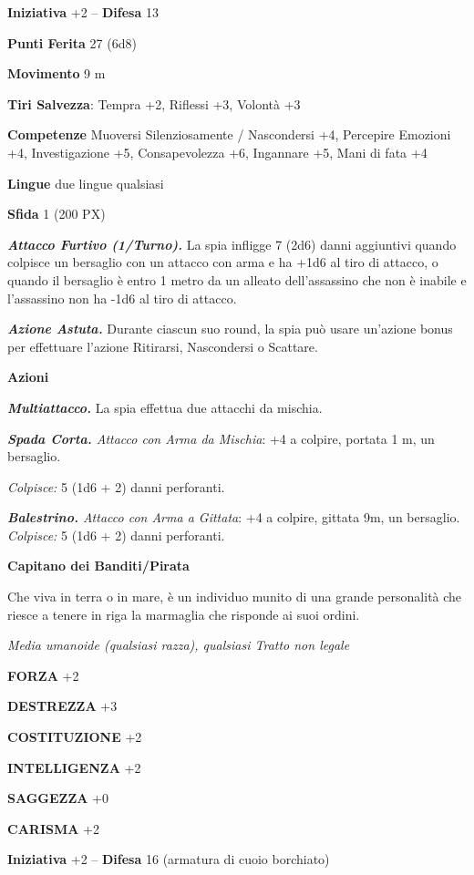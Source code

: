 \begin{multicols}{2}
\textbf{Iniziativa} +2 -- \textbf{Difesa} 13

\textbf{Punti Ferita} 27 (6d8)

\textbf{Movimento} 9 m

\textbf{Tiri Salvezza}: Tempra +2, Riflessi +3, Volontà +3

\textbf{Competenze} Muoversi Silenziosamente / Nascondersi +4, Percepire Emozioni +4, Investigazione +5, Consapevolezza +6, Ingannare +5, Mani di fata +4

\textbf{Lingue} due lingue qualsiasi

\textbf{Sfida} 1 (200 PX)

\textit{\textbf{Attacco Furtivo (1/Turno).}} La spia infligge 7 (2d6) danni aggiuntivi quando colpisce un bersaglio con un attacco con arma e ha +1d6 al tiro di attacco, o quando il bersaglio è entro 1 metro da un alleato dell'assassino che non è inabile e l'assassino non ha -1d6 al tiro di attacco.

\textit{\textbf{Azione Astuta.}} Durante ciascun suo round, la spia può usare un'azione bonus per effettuare l'azione Ritirarsi, Nascondersi o Scattare.

\textbf{Azioni}

\textit{\textbf{Multiattacco.}} La spia effettua due attacchi da mischia.

\textit{\textbf{Spada Corta.} Attacco con Arma da Mischia}: +4 a colpire, portata 1 m, un bersaglio.

\textit{Colpisce:} 5 (1d6 + 2) danni perforanti.

\textit{\textbf{Balestrino.} Attacco con Arma a Gittata}: +4 a colpire, gittata 9m, un bersaglio. \textit{Colpisce:} 5 (1d6 + 2) danni perforanti.


\medskip\textbf{Capitano dei Banditi/Pirata}

Che viva in terra o in mare, è un individuo munito di una grande personalità che riesce a tenere in riga la marmaglia che risponde ai suoi ordini.

\textit{Media umanoide (qualsiasi razza), qualsiasi Tratto non legale}

\textbf{FORZA} +2

\textbf{DESTREZZA} +3

\textbf{COSTITUZIONE} +2

\textbf{INTELLIGENZA} +2

\textbf{SAGGEZZA} +0

\textbf{CARISMA} +2

\textbf{Iniziativa} +2 -- \textbf{Difesa} 16 (armatura di cuoio borchiato)


\end{multicols}
